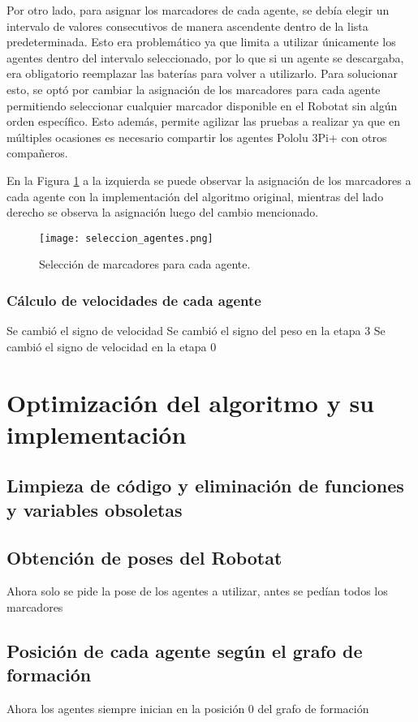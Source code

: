 Por otro lado, para asignar los marcadores de cada agente, se debía elegir un intervalo  de valores consecutivos de manera ascendente dentro de la lista predeterminada. Esto era problemático ya que limita a utilizar únicamente los agentes dentro del intervalo seleccionado, por lo que si un agente se descargaba, era obligatorio reemplazar las baterías para volver a utilizarlo. Para solucionar esto, se optó por cambiar la asignación de los marcadores para cada agente permitiendo seleccionar cualquier marcador disponible en el Robotat sin algún orden específico. Esto además, permite agilizar las pruebas a realizar ya que en múltiples ocasiones es necesario compartir los agentes Pololu 3Pi+ con otros compañeros.

En la Figura \ref{fig:seleccion_agentes} a la izquierda se puede observar la asignación de los marcadores a cada agente con la implementación del algoritmo original, mientras del lado derecho se observa la asignación luego del cambio mencionado.


\begin{figure}[H]
	\centering
	\texttt{[image: seleccion\_agentes.png]}
	\caption{Selección de marcadores para cada agente.}
	\label{fig:seleccion_agentes}
\end{figure}


\subsection{Cálculo de velocidades de cada agente}
	Se cambió el signo de velocidad
	Se cambió el signo del peso en la etapa 3
	Se cambió el signo de velocidad en la etapa 0


\chapter{Optimización del algoritmo y su implementación}

\section{Limpieza de código y eliminación de funciones y variables obsoletas}
\section{Obtención de poses del Robotat}
	Ahora solo se pide la pose de los agentes a utilizar, antes se pedían todos los marcadores
\section{Posición de cada agente según el grafo de formación}
	Ahora los agentes siempre inician en la posición 0 del grafo de formación
